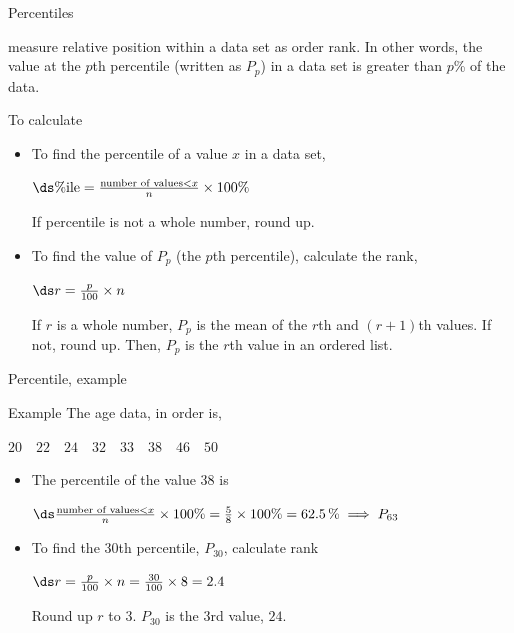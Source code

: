 \documentclass[xcolor=table]{beamer}
\begin{document}
\begin{frame}{Percentiles}
\begin{block}{}
\large
{} measure relative position within a data set as order rank. In other words, the value at the $p$th percentile (written as $P_p$) in a data set is greater than $p$\% of the data.
\end{block}

\pause
\begin{block}{To calculate}
\begin{itemize}
\item To find the percentile of a value $x$ in a data set,\\
\smallskip
{\centering
$\ds \%\text{ile} = \frac{\text{number of values} < x}{n} \times 100\%$
\par}
\medskip
If percentile is not a whole number, round up.
\medskip
\pause\item To find the value of $P_p$ (the $p$th percentile), calculate the rank,\\
\smallskip
{\centering
$\ds r = \frac p {100} \times n$
\par}
\medskip
If $r$ is a whole number, $P_p$ is the mean of the $r$th and $(r+1)$th values. If not, round up. Then, $P_p$ is the $r$th value in an ordered list.
\end{itemize}
\end{block}
\end{frame}

\begin{frame}{Percentile, example}
\begin{exampleblock}{Example}
The age data, in order is, \\
\smallskip
{\centering
$20 \quad 22 \quad 24 \quad 32 \quad 33 \quad 38 \quad 46 \quad 50$
\par}

\begin{itemize}
\pause
\item The percentile of the value 38 is\\
\medskip
{\centering
$\ds \frac{\text{number of values} < x}{n} \times 100\% = \frac{5}{8} \times 100\% = 62.5 \,\% \implies P_{63}$
\par} 
\medskip
\pause\item To find the 30th percentile, $P_{30}$, calculate rank\\
\medskip
{\centering
$\ds r= \frac {p}{100} \times n = \frac {30}{100} \times 8 = 2.4 $
\par}
\medskip
Round up $r$ to $3$. $P_{30}$ is the 3rd value, $24$.
\end{itemize}
\end{exampleblock}
\end{frame}
\end{document}
